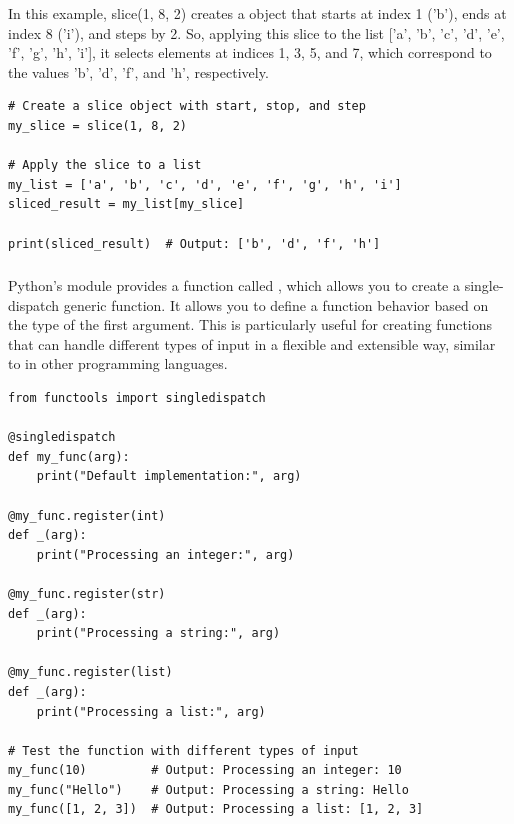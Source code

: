 In this example, slice(1, 8, 2) creates a  object that starts at index 1 ('b'), ends at index 8 ('i'), and steps by 2. So, applying this slice to the list ['a', 'b', 'c', 'd', 'e', 'f', 'g', 'h', 'i'], it selects elements at indices 1, 3, 5, and 7, which correspond to the values 'b', 'd', 'f', and 'h', respectively.
\begin{lstlisting}
# Create a slice object with start, stop, and step
my_slice = slice(1, 8, 2)

# Apply the slice to a list
my_list = ['a', 'b', 'c', 'd', 'e', 'f', 'g', 'h', 'i']
sliced_result = my_list[my_slice]

print(sliced_result)  # Output: ['b', 'd', 'f', 'h']
\end{lstlisting}












\subsubsection{}

Python's  module provides a function called , which allows you to create a single-dispatch generic function. It allows you to define a function behavior based on the type of the first argument. This is particularly useful for creating functions that can handle different types of input in a flexible and extensible way, similar to  in other programming languages.
\begin{lstlisting}
from functools import singledispatch

@singledispatch
def my_func(arg):
    print("Default implementation:", arg)

@my_func.register(int)
def _(arg):
    print("Processing an integer:", arg)

@my_func.register(str)
def _(arg):
    print("Processing a string:", arg)

@my_func.register(list)
def _(arg):
    print("Processing a list:", arg)

# Test the function with different types of input
my_func(10)         # Output: Processing an integer: 10
my_func("Hello")    # Output: Processing a string: Hello
my_func([1, 2, 3])  # Output: Processing a list: [1, 2, 3]
\end{lstlisting}

